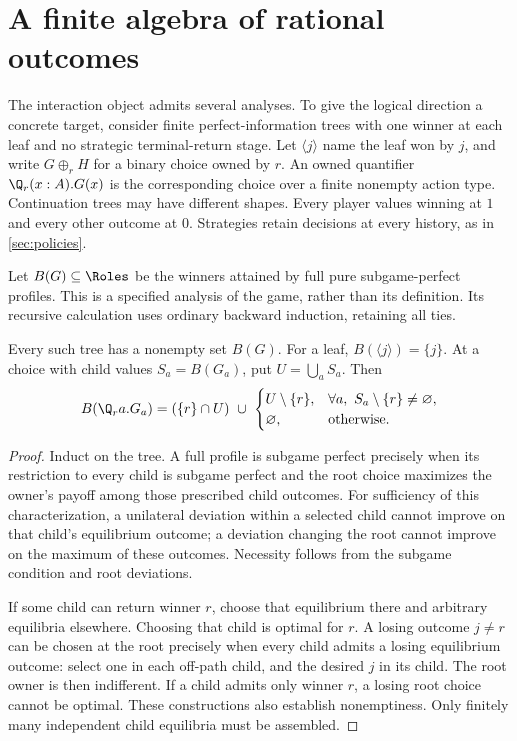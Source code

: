 \section{A finite algebra of rational outcomes}
\label{sec:rational}

The interaction object admits several analyses. To give the logical
direction a concrete target, consider finite perfect-information trees
with one winner at each leaf and no strategic terminal-return stage.
Let $\langle j\rangle$ name the leaf won by $j$, and write
$G\oplus_r H$ for a binary choice owned by $r$.
An owned quantifier $\Q_r(x:A).G(x)$ is the corresponding choice over a
finite nonempty action type. Continuation trees may have different shapes.
Every player values winning at $1$ and every other outcome at $0$.
Strategies retain decisions at every history, as in
\cref{sec:policies}.

Let $B(G)\subseteq\Roles$ be the winners attained by full pure
subgame-perfect profiles. This is a specified analysis of the game, rather
than its definition. Its recursive calculation uses ordinary backward
induction, retaining all ties.

\begin{proposition}
\label{prop:rational}
Every such tree has a nonempty set $B(G)$. For a leaf,
$B(\langle j\rangle)=\{j\}$. At a choice with child values
$S_a=B(G_a)$, put $U=\bigcup_a S_a$. Then
\[
 B(\Q_r a.G_a)=
 (\{r\}\cap U)\ \cup\
 \begin{cases}
 U\setminus\{r\},&
       \forall a,\ S_a\setminus\{r\}\ne\varnothing,\\
 \varnothing,&\text{otherwise}.
 \end{cases}
\]
\end{proposition}
\begin{proof}
Induct on the tree. A full profile is subgame perfect precisely when its
restriction to every child is subgame perfect and the root choice maximizes
the owner's payoff among those prescribed child outcomes.
For sufficiency of this characterization, a unilateral deviation within
a selected child cannot improve on that child's equilibrium outcome;
a deviation changing the root cannot improve on the maximum of these
outcomes. Necessity follows from the subgame condition and root deviations.

If some child can return winner $r$, choose that equilibrium there and
arbitrary equilibria elsewhere. Choosing that child is optimal for $r$.
A losing outcome $j\ne r$ can be chosen at the root precisely when every
child admits a losing equilibrium outcome: select one in each off-path
child, and the desired $j$ in its child. The root owner is then indifferent.
If a child admits only winner $r$, a losing root choice cannot be optimal.
These constructions also establish nonemptiness. Only finitely many
independent child equilibria must be assembled.
\end{proof}

